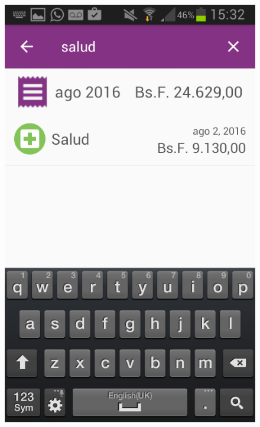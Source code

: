 \begin{figure}[ht]
\begin{minipage}{.5\textwidth}
  \includegraphics[scale=0.30,type=png,ext=.png,read=.png]{imagenes/Screenshots/filter}
  \captionsetup{justification=centering}
  \label{fig:interfazFiltrarGastos}
\end{minipage}
\end{figure}

